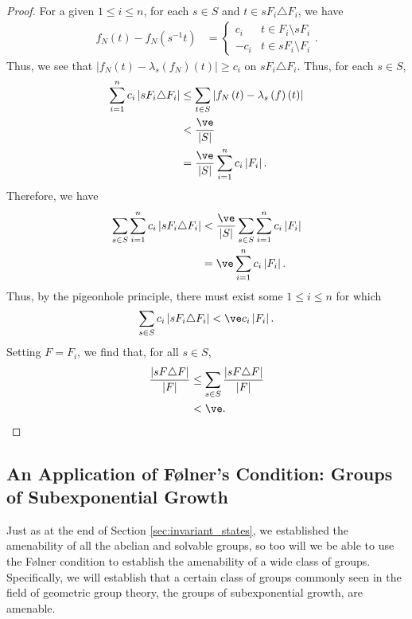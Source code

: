 \documentclass[10pt]{mypackage2}
\begin{document}
\begin{proof}
  For a given $1 \leq i \leq n$, for each $s\in S$ and $t\in sF_i\triangle F_i$, we have
  \begin{align*}
    f_N\left(t\right) - f_N\left(s^{-1}t\right) &= \begin{cases}
      c_i & t\in F_i\setminus sF_i\\
      -c_i & t\in sF_i \setminus F_i
    \end{cases}.
  \end{align*}
  Thus, we see that $\left\vert f_N\left(t\right)-\lambda_s\left(f_N\right)\left(t\right) \right\vert\geq c_i$ on $sF_i\triangle F_i$. Thus, for each $s\in S$,
  \begin{align*}
    \sum_{i=1}^{n}c_i\left\vert sF_i \triangle F_i \right\vert &\leq \sum_{t\in S}\left\vert f_N\left(t\right) -  \lambda_s\left(f\right)\left(t\right)\right\vert\\
                                                               &< \frac{\ve}{\left\vert S \right\vert}\\
                                                               &= \frac{\ve}{\left\vert S \right\vert} \sum_{i=1}^{n}c_i\left\vert F_i \right\vert.
  \end{align*}
  Therefore, we have
  \begin{align*}
    \sum_{s\in S}\sum_{i=1}^{n}c_i\left\vert sF_i\triangle F_i \right\vert &< \frac{\ve}{\left\vert S \right\vert}\sum_{s\in S}\sum_{i=1}^{n}c_i\left\vert F_i \right\vert\\
                                                                           &= \ve \sum_{i=1}^{n}c_i\left\vert F_i \right\vert.
  \end{align*}
  Thus, by the pigeonhole principle, there must exist some $1\leq i \leq n$ for which
  \begin{align*}
    \sum_{s\in S}c_i\left\vert sF_i\triangle F_i \right\vert < \ve c_i\left\vert F_i \right\vert.
  \end{align*}
  Setting $F = F_i$, we find that, for all $s\in S$,
  \begin{align*}
    \frac{\left\vert sF\triangle F \right\vert}{\left\vert F \right\vert} &\leq \sum_{s\in S}\frac{\left\vert sF\triangle F \right\vert}{\left\vert F \right\vert}\\
                                                                          &< \ve.
  \end{align*}
\end{proof}
\subsection{An Application of Følner's Condition: Groups of Subexponential Growth}%
Just as at the end of Section \ref{sec:invariant_states}, we established the amenability of all the abelian and solvable groups, so too will we be able to use the Følner condition to establish the amenability of a wide class of groups. Specifically, we will establish that a certain class of groups commonly seen in the field of geometric group theory, the groups of subexponential growth, are amenable.\newline
\end{document}
